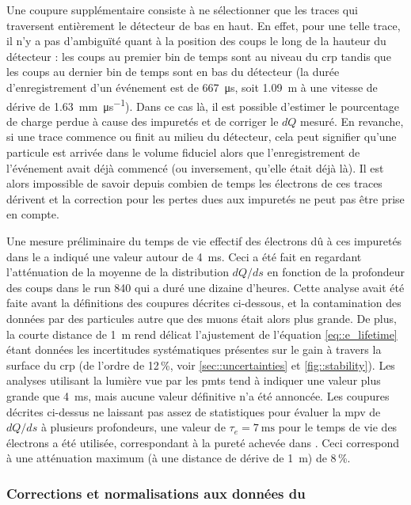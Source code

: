         Une coupure supplémentaire consiste à ne sélectionner que les traces qui traversent entièrement le détecteur de bas en haut. En effet, pour une telle trace, il n'y a pas d'ambiguïté quant à la position des coups le long de la hauteur du détecteur : les coups au premier bin de temps sont au niveau du \gls{crp} tandis que les coups au dernier bin de temps sont en bas du détecteur (la durée d'enregistrement d'un événement est de \SI{667}{\micro\second}, soit \SI{1.09}{\meter} à une vitesse de dérive de \SI{1.63}{\milli\meter\per\micro\second}). Dans ce cas là, il est possible d'estimer le pourcentage de charge perdue à cause des impuretés et de corriger le $dQ$ mesuré. En revanche, si une trace commence ou finit au milieu du détecteur, cela peut signifier qu'une particule est arrivée dans le volume fiduciel alors que l'enregistrement de l'événement avait déjà commencé (ou inversement, qu'elle était déjà là). Il est alors impossible de savoir depuis combien de temps les électrons de ces traces dérivent et la correction pour les pertes dues aux impuretés ne peut pas être prise en compte.

        Une mesure préliminaire du temps de vie effectif des électrons dû à ces impuretés dans le \TOO{} a indiqué une valeur autour de \SI{4}{\milli\second}\cite{Aimard2018}. Ceci a été fait en regardant l'atténuation de la moyenne de la distribution $dQ/ds$ en fonction de la profondeur des coups dans le run 840 qui a duré une dizaine d'heures. Cette analyse avait été faite avant la définitions des coupures décrites ci-dessous, et la contamination des données par des particules autre que des muons était alors plus grande. De plus, la courte distance de \SI{1}{\meter} rend délicat l'ajustement de l'équation \eqref{eq::e_lifetime} étant données les incertitudes systématiques présentes sur le gain à travers la surface du \gls{crp} (de l'ordre de 12\,\%, voir \autoref{sec::uncertainties} et \autoref{fig::stability}). Les analyses utilisant la lumière vue par les \glspl{pmt} tend à indiquer une valeur plus grande que \SI{4}{\milli\second}, mais aucune valeur définitive n'a été annoncée. Les coupures décrites ci-dessus ne laissant pas assez de statistiques pour évaluer la \gls{mpv} de $dQ/ds$ à plusieurs profondeurs, une valeur de $\tau_e = \SI{7}{\milli\second}$ pour le temps de vie des électrons a été utilisée, correspondant à la pureté achevée dans \protosp{}. Ceci correspond à une atténuation maximum (à une distance de dérive de \SI{1}{\meter}) de 8\,\%.
        
      \subsubsection{Corrections et normalisations aux données du \threeL{}}
        
